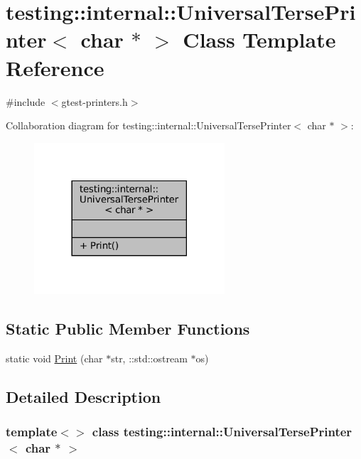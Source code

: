 \hypertarget{classtesting_1_1internal_1_1UniversalTersePrinter_3_01char_01_5_01_4}{}\section{testing\+:\+:internal\+:\+:Universal\+Terse\+Printer$<$ char $\ast$ $>$ Class Template Reference}
\label{classtesting_1_1internal_1_1UniversalTersePrinter_3_01char_01_5_01_4}


{\ttfamily \#include $<$gtest-\/printers.\+h$>$}



Collaboration diagram for testing\+:\+:internal\+:\+:Universal\+Terse\+Printer$<$ char $\ast$ $>$\+:
\nopagebreak
\begin{figure}[H]
\begin{center}
\leavevmode
\includegraphics[width=201pt]{classtesting_1_1internal_1_1UniversalTersePrinter_3_01char_01_5_01_4__coll__graph}
\end{center}
\end{figure}
\subsection*{Static Public Member Functions}
\begin{DoxyCompactItemize}
\item 
static void \hyperlink{classtesting_1_1internal_1_1UniversalTersePrinter_3_01char_01_5_01_4_aa9ef95587c1461fe33e254af52401a43}{Print} (char $\ast$str, \+::std\+::ostream $\ast$os)
\end{DoxyCompactItemize}


\subsection{Detailed Description}
\subsubsection*{template$<$$>$\newline
class testing\+::internal\+::\+Universal\+Terse\+Printer$<$ char $\ast$ $>$}



